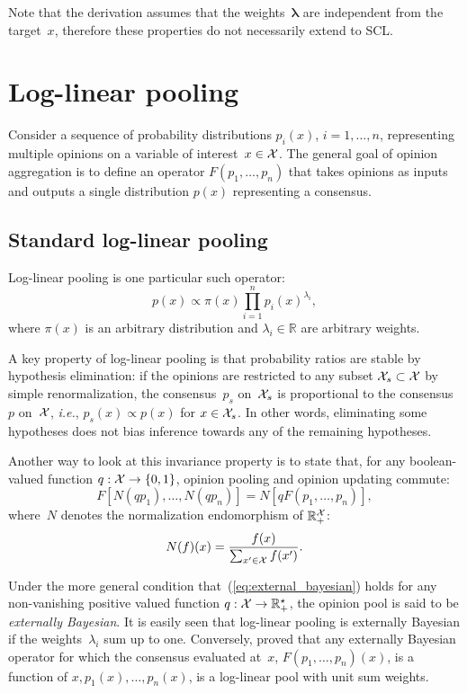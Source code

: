 \documentclass[english]{scrartcl}
\newcommand{\blambda}{{\boldsymbol{\lambda}}}
\begin{document}
Note that the derivation assumes that the weights~$\blambda$ are independent from the target~$x$, therefore these properties do not necessarily extend to SCL.




\section{Log-linear pooling}
\label{app:log_pool}

Consider a sequence of probability distributions $p_i(x)$, $i=1,\ldots,n$, representing multiple opinions on a variable of interest~$x\in{\cal X}$. The general goal of opinion aggregation is to define an operator $F(p_1,\ldots,p_n)$ that takes opinions as inputs and outputs a single distribution $p(x)$ representing a consensus.

\subsection{Standard log-linear pooling}
\label{app:log_pool_standard}

Log-linear pooling \cite{Genest-86} is one particular such operator:
$$
p(x)\propto \pi(x) \prod_{i=1}^n p_i(x)^{\lambda_i},
$$
where $\pi(x)$ is an arbitrary distribution and $\lambda_i\in\mathbb{R}$ are arbitrary weights. 

A key property of log-linear pooling is that probability ratios are stable by hypothesis elimination: if the opinions are restricted to any subset ${\cal X}_s\subset {\cal X}$ by simple renormalization, the consensus~$p_s$ on~${\cal X}_s$ is proportional to the consensus~$p$ on~${\cal X}$, {\em i.e.}, $p_s(x)\propto p(x)$ for $x\in{\cal X}_s$. In other words, eliminating some hypotheses does not bias inference towards any of the remaining hypotheses.

Another way to look at this invariance property is to state that, for any boolean-valued function $q:{\cal X}\to \{0,1\}$, opinion pooling and opinion updating commute: 
\begin{equation}
\label{eq:external_bayesian}
F[N(q p_1), \ldots, N(q p_n)]
=
N[q F(p_1,\ldots, p_n)],
\end{equation}
where~$N$ denotes the normalization endomorphism of $\mathbb{R}_+^{\cal X}$:
$$
N(f)(x) = \frac{f(x)}{\sum_{x'\in{\cal X}} f(x')}
.
$$

Under the more general condition that~(\ref{eq:external_bayesian}) holds for any non-vanishing positive valued function $q:{\cal X}\to\mathbb{R}^\star_+$,  the opinion pool is said to be {\em externally Bayesian}. It is easily seen that log-linear pooling is externally Bayesian if the weights~$\lambda_i$ sum up to one. Conversely, \cite{Genest-86b} proved that any externally Bayesian operator for which the consensus evaluated at~$x$, $F(p_1,\ldots,p_n)(x)$, is a function of $x,p_1(x),\ldots,p_n(x)$, is a log-linear pool with unit sum weights. 
\end{document}
